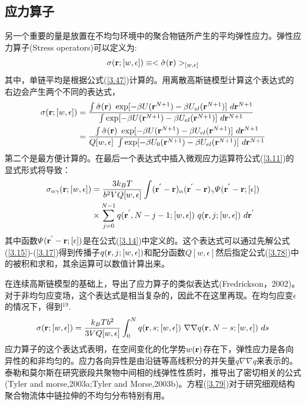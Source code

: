 \subsection{应力算子}
另一个重要的量是放置在不均匀环境中的聚合物链所产生的平均弹性应力。弹性应力算子(Stress operators)可以定义为:
\begin{equation}\label{3.76}
\sigma(\mathbf{\mathbf{r}};[w,\epsilon])\equiv<\hat{\sigma}(\mathbf{r})>_{[w,\epsilon]}
\end{equation}
其中，单链平均是根据公式(\ref{3.47})计算的。用离散高斯链模型计算这个表达式的右边会产生两个不同的表达式，
\begin{equation}\label{3.77}
\begin{aligned}
\sigma(\mathbf{r};[w,\epsilon])&=\frac{\int {\hat{\sigma}}(\mathbf{r})~\exp[-\beta U(\mathbf{r}^{N+1})-\beta U_{el}(\mathbf{r}^{N+1})]~d\mathbf{r}^{N+1}}{\int \exp[-\beta U(\mathbf{r}^{N+1})-\beta U_{el}(\mathbf{r}^{N+1})]~d\mathbf{r}^{N+1}}\\&=\frac{\int \hat{\sigma}(\mathbf{r})~\exp[-\beta U(\mathbf{r}^{N+1})-\beta U_{el}(\mathbf{r}^{N+1})]~d\mathbf{r}^{N+1}}{Q[w,\epsilon]~\int \exp[-\beta U_0(\mathbf{r}^{N+1})-\beta U_{el}(\mathbf{r}^{N+1})]~d\mathbf{r}^{N+1}}
\end{aligned}
\end{equation}
第二个是最方便计算的。在最后一个表达式中插入微观应力运算符公式(\ref{3.11})的显式形式将导致：
\begin{equation}
\begin{aligned}\label{3.78}
\sigma_{\alpha \gamma}(\mathbf{r};[w,\epsilon])&=\frac{3k_BT}{b^2VQ[w,\epsilon]} \int (\mathbf{r}^{'}-\mathbf{r})_{\alpha} (\mathbf{r}^{'}-\mathbf{r})_{\gamma} \varPsi (\mathbf{r}^{'}-\mathbf{r};[\epsilon])\\&\times \sum_{j=0}^{N-1}q(\mathbf{r}^{'},N-j-1;[w,\epsilon])~q(\mathbf{r},j;[w,\epsilon])~d\mathbf{r}^{'}
\end{aligned}
\end{equation}
其中函数$\varPsi (\mathbf{r}^{'}-\mathbf{r};[\epsilon])$是在公式(\ref{3.14})中定义的。这个表达式可以通过先解公式(\ref{3.15})-(\ref{3.17})得到传播子$q(\mathbf{r},j;[w,\epsilon])$和配分函数$Q[w,\epsilon]$然后指定公式(\ref{3.78})中的被积和求和，其余运算可以数值计算出来。

在连续高斯链模型的基础上，导出了应力算子的类似表达式(Fredrickson，2002)。对于非均匀应变场，这个表达式是相当复杂的，因此不在这里再现。在均匀应变$\epsilon$的情况下，得到$^{19}$.
\begin{equation}\label{3.79}
\sigma(\mathbf{r};[w,\epsilon])=\frac{k_BTb^2}{3VQ[w,\epsilon]}\int_{0}^{N} q(\mathbf{r},s;[w,\epsilon])~\nabla \nabla q(\mathbf{r},N-s;[w,\epsilon])~ds
\end{equation}
应力算子的这个表达式表明，在空间变化的化学势$w(\mathbf{r})$存在下，弹性应力是各向异性的和非均匀的。应力各向异性是由沿链等高线积分的并矢量$q\nabla \nabla q$来表示的。泰勒和莫尔斯在研究嵌段共聚物中间相的线弹性性质时，推导出了密切相关的公式(Tyler and morse,2003a;Tyler and Morse,2003b)。方程(\ref{3.79})对于研究细观结构聚合物流体中链拉伸的不均匀分布特别有用。

